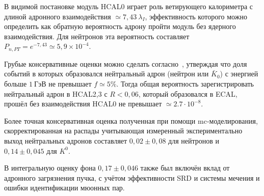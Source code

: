 В видимой постановке модуль HCAL0 играет роль ветирующего
калориметра с длиной адронного взаимодействия $\simeq 7{,}43~ \lambda_I$,
эффективность которого можно определить как обратную вероятность
адрону пройти модуль без ядерного взаимодействия.
Для нейтронов эта вероятность
составляет~$P_{n,PT} = e^{-7{,}43}\simeq5{,}9\times 10^{-4}$.

Грубые консервативные оценки можно сделать
согласно~\cite{leading-neutron-hera}, утверждая что доля
событий в которых образовался нейтральный адрон (нейтрон или $\bar{K}_{0}$)
с энергией больше $1~\text{ГэВ}$ не превышает $f \simeq 5\%$.
Тогда общая вероятность зарегистрировать нейтральный адрон
в HCAL2,3 с $R < 0{,}06$, который образовался в ECAL, прошёл без
взаимодействия HCAL0 не превышает $\simeq 2.7\cdot 10^{-8}$.

Более точная консервативная оценка полученная при
помощи \acrshort{mc}-моделирования, скорректированная на
распады учитывающая измеренный экспериментально выход нейтральных
адронов составляет $0{,}02 \pm 0{,}08$ для
нейтронов и $0{,}14\pm0{,}045$ для $K^0$.

В интегральную оценку фона $0{,}17\pm0{,}046$ также был включён
вклад от адронного загрязнения пучка, с учётом эффективности
SRD и системы мечения и ошибки идентификации мюонных пар.

